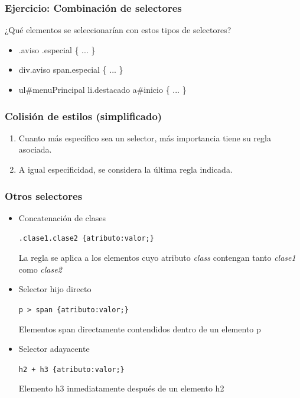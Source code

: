 \documentclass[ucs]{beamer}
\begin{document}

\begin{frame}
\frametitle{Ejercicio: Combinación de selectores}

¿Qué elementos se seleccionarían con estos tipos de selectores?

\begin{itemize}
  \item .aviso .especial \{ ... \}
  \item div.aviso span.especial \{ ... \}
  \item ul\#menuPrincipal li.destacado a\#inicio \{ ... \}
\end{itemize}

\end{frame}


\begin{frame}
\frametitle{Colisión de estilos (simplificado)}

\begin{enumerate}
  \item Cuanto más específico sea un selector, más importancia tiene su regla asociada.
  \item A igual especificidad, se considera la última regla indicada.
\end{enumerate}

\end{frame}



\begin{frame}[fragile]
\frametitle{Otros selectores}
\begin{itemize}
\item
Concatenación de clases

\verb|.clase1.clase2 {atributo:valor;}|


La regla se aplica a los elementos cuyo atributo
\emph{class}
contengan tanto
\emph{clase1}
como
\emph{clase2}

\item
Selector hijo directo

\verb|p > span {atributo:valor;}|

Elementos span directamente contendidos dentro de un elemento p

\item
Selector adayacente

\verb|h2 + h3 {atributo:valor;}|

Elemento h3 inmediatamente después de un elemento h2

\end{itemize}

\end{frame}
\end{document}
